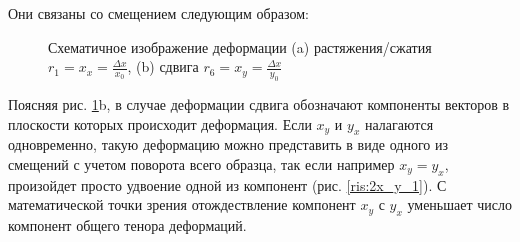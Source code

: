 Они связаны со смещением следующим образом:
\begin{figure}[H]
  \centering
  \hfill
  \caption{Схематичное изображение деформации (a)
  растяжения/сжатия $r_1= x_x = \frac{\Delta x}{x_0}$, (b) сдвига  $r_6= x_y = \frac{\Delta x}{y_0} $ }
  \label{ris:deform_piezo}
\end{figure}


Поясняя рис. \ref{ris:deform_piezo}b, в случае деформации сдвига обозначают
компоненты векторов в плоскости которых происходит деформация. Если $x_y$ и $y_x$
налагаются одновременно, такую деформацию можно представить в виде одного из
смещений с учетом поворота всего образца, так если например $x_y = y_x$, произойдет
просто удвоение одной из компонент (рис. \ref{ris:2x_y_1}). С математической
точки зрения отождествление компонент $x_y$ с $y_x$ уменьшает число компонент
общего тенора деформаций.

